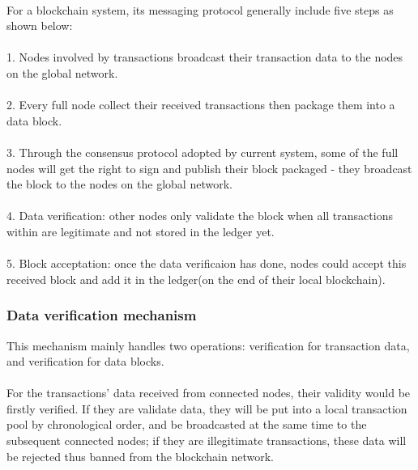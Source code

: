 \documentclass[]{article}
\begin{document}
\begin{CJK*}{UTF8}{gbsn}
\paragraph{} For a blockchain system, its messaging protocol generally include five steps as shown below:
\paragraph{} 1. Nodes involved by transactions broadcast their transaction data to the nodes on the global network.
\paragraph{} 2. Every full node collect their received transactions then package them into a data block.
\paragraph{} 3. Through the consensus protocol adopted by current system, some of the full nodes will get the right to sign and publish their block packaged - they broadcast the block to the nodes on the global network.
\paragraph{} 4. Data verification: other nodes only validate the block when all transactions within are legitimate and not stored in the ledger yet.
\paragraph{} 5. Block acceptation: once the data verificaion has done, nodes could accept this received block and add it in the ledger(on the end of their local blockchain).
\subsubsection*{Data verification mechanism}
This mechanism mainly handles two operations: verification for transaction data, and verification for data blocks.
\paragraph{} For the transactions' data received from connected nodes, their validity would be firstly verified. If they are validate data, they will be put into a local transaction pool by chronological order, and be broadcasted at the same time to the subsequent connected nodes; if they are illegitimate transactions, these data will be rejected thus banned from the blockchain network.

\end{CJK*}
\end{document}
